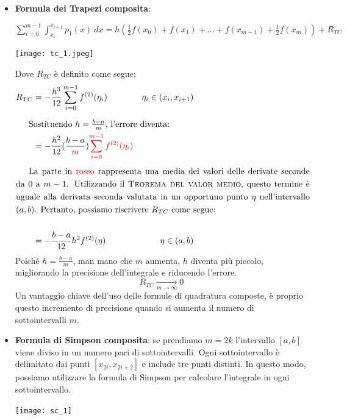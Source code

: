 \documentclass{article}
\begin{document}
\begin{itemize}
    \item \textbf{Formula dei Trapezi composita}:

            $\displaystyle\sum_{i=0}^{m-1}\displaystyle\int_{x_i}^{x_{i+1}}p_1(x)\
                dx=h(\frac{1}{2}f(x_0)+f(x_1)+\ldots+f(x_{m-1})+\frac{1}{2}f(x_m))+R_{TC}$
                \begin{center}
                    \texttt{[image: tc\_1.jpeg]}
                \end{center}
                Dove $R_{TC}$ è definito come segue:
                \begin{equation}\label{eq:error_tc}
                   \begin{aligned}
                       R_{TC} &= -
                       \frac{h^3}{12}\displaystyle\sum_{i=0}^{m-1}f^{(2)}(\eta_i)
                              & \eta_i\in(x_i,x_{i+1})\\ 
                              \alignedintertext{Sostituendo $h=\frac{b-a}{m}$,
                              l'errore diventa:}
                              &=
                              -\frac{h^2}{12}(\frac{b-a}{\color{red}{m}}){\color{red}\displaystyle\sum_{i=0}^{m-1}f^{(2)}(\eta_i)}\\
                              \alignedintertext{La parte in
                              {\color{red}rosso} rappresenta una media dei
                          valori delle derivate seconde da 0 a $m-1$.
                          Utilizzando il \textsc{Teorema del valor medio}, questo termine è uguale alla
                  derivata seconda valutata in un opportuno punto $\eta$
              nell'intervallo $(a,b)$. Pertanto, possiamo riscrivere $R_{TC}$
          come segue:} \\ 
                             &= - \frac{b-a}{12}h^2f^{(2)}(\eta) & \eta
                             \in(a,b)
                   \end{aligned} 
                \end{equation}
                Poiché $h=\frac{b-a}{m}$, man mano che $m$ aumenta, $h$ diventa più
                piccolo, migliorando la precisione dell'integrale e riducendo
                l'errore. 
                $$R_{TC}\underset{m\to\infty}{\to}0$$
                Un vantaggio chiave dell'uso delle formule di
                quadratura composte, è proprio questo incremento di precisione
                quando si aumenta il numero di sottointervalli $m$. 
    \item \textbf{Formula di Simpson composita}:
        se prendiamo $m=2k$ l'intervallo $[a,b]$ viene diviso in un numero
        pari di sottointervalli. Ogni sottointervallo è delimitato dai punti
        $[x_{2i},x_{2i+2}]$ e include tre punti distinti. In questo modo,
        possiamo utilizzare la formula di Simpson per calcolare l'integrale in ogni
        sottointervallo.
        \begin{center}
            \texttt{[image: sc\_1]}
        \end{center}


\end{itemize}
\end{document}
